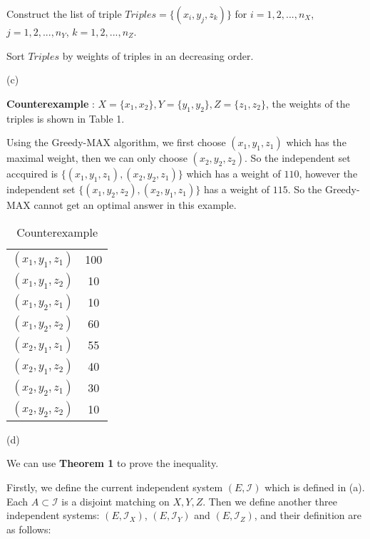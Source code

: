 \documentclass[12pt,a4paper]{article}
\theoremstyle{definition}
\begin{document}
\begin{enumerate}
\begin{minipage}[t]{0.90\textwidth}
\begin{algorithm}[H]
		   Construct the list of triple $Triples = \{(x_i, y_j, z_k)\}$ for $i=1, 2, ..., n_X$, $j = 1, 2, ..., n_Y$, $k = 1, 2, ..., n_Z$. 
		   
		   Sort $Triples$ by weights of triples in an decreasing order.

		\end{algorithm}
    \end{minipage} 



	(c)

	\textbf{Counterexample} : $X = \{x_1, x_2\}, Y=\{y_1, y_2\}, Z = \{z_1, z_2\}$, the weights of the triples is shown in Table 1.

	Using the Greedy-MAX algorithm, we first choose $(x_1, y_1, z_1)$ which has the maximal weight, then we can only choose $(x_2, y_2, z_2)$. So the independent set 
	accquired is $\{(x_1, y_1, z_1), (x_2, y_2, z_1)\}$ which has a weight of $110$, however the independent set $\{(x_1, y_2, z_2), (x_2, y_1, z_1)\}$ 
	has a weight of $115$. So the Greedy-MAX cannot get an optimal answer in this example.

	\begin{table}[]\label{tab}
		\centering
		\begin{tabular}{|c|c|}
			\hline
		    $(x_1, y_1, z_1)$	&		100     \\
			$(x_1, y_1, z_2)$   &       10    \\
			$(x_1, y_2, z_1)$	&		10	 \\
			$(x_1, y_2, z_2)$	&		60	 \\
			$(x_2, y_1, z_1)$	&		55	 \\
			$(x_2, y_1, z_2)$	&		40	 \\
			$(x_2, y_2, z_1)$	&		30	 \\
			$(x_2, y_2, z_2)$	&		10	 \\
			\hline
		\end{tabular}
		\caption{Counterexample}
	\end{table}



	(d) 
	
	We can use \textbf{Theorem 1} to prove the inequality.

	Firstly, we define the current independent system $(E, \mathcal{I})$ which is defined in (a). Each $A \subset \mathcal{I}$ is a disjoint matching on $X, Y, Z$. Then we define another three independent systems:
	$(E, \mathcal{I}_X)$, $(E, \mathcal{I}_Y)$ and $(E, \mathcal{I}_Z)$, and their definition are as follows:


\end{enumerate}
\end{document}
